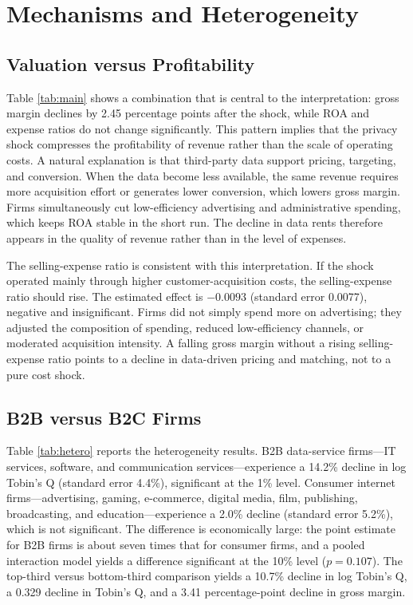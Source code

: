 \section{Mechanisms and Heterogeneity}
\label{sec:mechanism}

\subsection{Valuation versus Profitability}

Table \ref{tab:main} shows a combination that is central to the interpretation: gross margin declines by 2.45 percentage points after the shock, while ROA and expense ratios do not change significantly. This pattern implies that the privacy shock compresses the profitability of revenue rather than the scale of operating costs. A natural explanation is that third-party data support pricing, targeting, and conversion. When the data become less available, the same revenue requires more acquisition effort or generates lower conversion, which lowers gross margin. Firms simultaneously cut low-efficiency advertising and administrative spending, which keeps ROA stable in the short run. The decline in data rents therefore appears in the quality of revenue rather than in the level of expenses.

The selling-expense ratio is consistent with this interpretation. If the shock operated mainly through higher customer-acquisition costs, the selling-expense ratio should rise. The estimated effect is $-0.0093$ (standard error 0.0077), negative and insignificant. Firms did not simply spend more on advertising; they adjusted the composition of spending, reduced low-efficiency channels, or moderated acquisition intensity. A falling gross margin without a rising selling-expense ratio points to a decline in data-driven pricing and matching, not to a pure cost shock.

\subsection{B2B versus B2C Firms}

Table \ref{tab:hetero} reports the heterogeneity results. B2B data-service firms—IT services, software, and communication services—experience a 14.2\% decline in log Tobin's Q (standard error 4.4\%), significant at the 1\% level. Consumer internet firms—advertising, gaming, e-commerce, digital media, film, publishing, broadcasting, and education—experience a 2.0\% decline (standard error 5.2\%), which is not significant. The difference is economically large: the point estimate for B2B firms is about seven times that for consumer firms, and a pooled interaction model yields a difference significant at the 10\% level ($p=0.107$). The top-third versus bottom-third comparison yields a 10.7\% decline in log Tobin's Q, a 0.329 decline in Tobin's Q, and a 3.41 percentage-point decline in gross margin.

